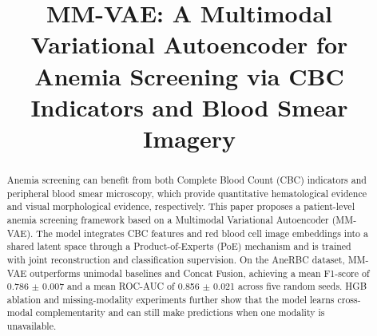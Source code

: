 \documentclass[conference]{IEEEtran}
\begin{document}
\title{MM-VAE: A Multimodal Variational Autoencoder for Anemia Screening via CBC Indicators and Blood Smear Imagery}

\author{
\and
{}
\and
{}
\and
{}
}

\maketitle

\begingroup
\renewcommand\thefootnote{}
\endgroup

\begin{abstract}
Anemia screening can benefit from both Complete Blood Count (CBC) indicators and peripheral blood smear microscopy, which provide quantitative hematological evidence and visual morphological evidence, respectively. This paper proposes a patient-level anemia screening framework based on a Multimodal Variational Autoencoder (MM-VAE). The model integrates CBC features and red blood cell image embeddings into a shared latent space through a Product-of-Experts (PoE) mechanism and is trained with joint reconstruction and classification supervision. On the AneRBC dataset, MM-VAE outperforms unimodal baselines and Concat Fusion, achieving a mean F1-score of 0.786 $\pm$ 0.007 and a mean ROC-AUC of 0.856 $\pm$ 0.021 across five random seeds. HGB ablation and missing-modality experiments further show that the model learns cross-modal complementarity and can still make predictions when one modality is unavailable.
\end{abstract}
\end{document}
